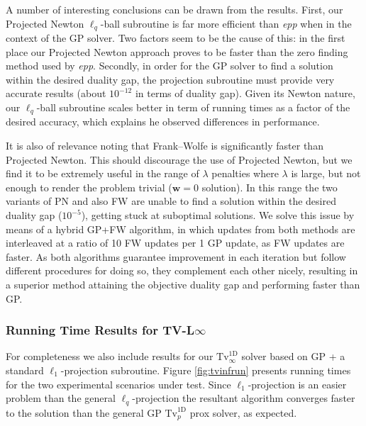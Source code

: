 \documentclass[twoside,11pt]{article}
\newcommand{\vw}{\bm{w}}       \newcommand{\vwh}{\hat{\bm{w}}}        \newcommand{\wh}{\hat{w}}    \newcommand{\vwt}{\tilde{\bm{w}}}       \newcommand{\wt}{\tilde{w}}
\newcommand{\tvell}{\text{Tv}}
\newcommand{\oned}{\text{1D}}
\numberwithin{equation}{section}
\numberwithin{theorem}{section}
\begin{document}
A number of interesting conclusions can be drawn from the results. First, our Projected Newton $\ell_q$-ball subroutine is far more efficient than {\it epp} when in the context of the GP solver. Two factors seem to be the cause of this: in the first place our Projected Newton approach proves to be faster than the zero finding method used by {\it epp}. Secondly, in order for the GP solver to find a solution within the desired duality gap, the projection subroutine must provide very accurate results (about $10^{-12}$ in terms of duality gap). Given its Newton nature, our $\ell_q$-ball subroutine scales better in term of running times as a factor of the desired accuracy, which explains he observed differences in performance.

It is also of relevance noting that Frank--Wolfe is significantly faster than Projected Newton. This should discourage the use of Projected Newton, but we find it to be extremely useful in the range of $\lambda$ penalties where $\lambda$ is large, but not enough to render the problem trivial ($\vw = 0$ solution). In this range the two variants of PN and also FW are unable to find a solution within the desired duality gap ($10^{-5}$), getting stuck at suboptimal solutions. We solve this issue by means of a hybrid GP+FW algorithm, in which updates from both methods are interleaved at a ratio of 10 FW updates per 1 GP update, as FW updates are faster. As both algorithms guarantee improvement in each iteration but follow different procedures for doing so, they complement each other nicely, resulting in a superior method attaining the objective duality gap and performing faster than GP.

\subsubsection{Running Time Results for TV-L$\infty$}

For completeness we also include results for our $\tvell_{\infty}^{\oned}$ solver based on GP + a standard $\ell_1$-projection subroutine. Figure \ref{fig:tvinfrun} presents running times for the two experimental scenarios under test. Since $\ell_1$-projection is an easier problem than the general $\ell_q$-projection the resultant algorithm converges faster to the solution than the general GP $\tvell_{p}^{\oned}$ prox solver, as expected.
\end{document}
